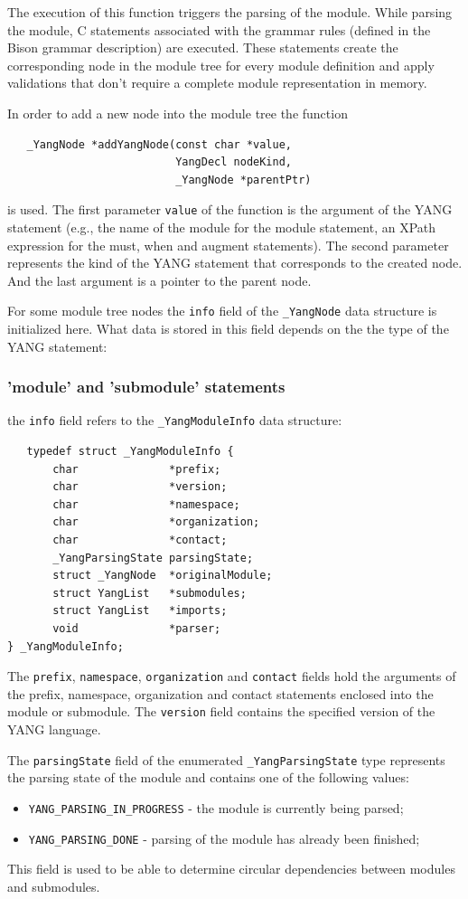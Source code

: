 \documentclass[conference]{IEEEtran}
\begin{document}
The execution of this function triggers the parsing of the module. While parsing the module, C statements associated with the grammar rules (defined in the Bison grammar description) are executed. These statements create the corresponding node in the module tree for every module definition and apply validations that don't require a complete module representation in memory.

In order to add a new node into the module tree the function
\small
\begin{verbatim}
   _YangNode *addYangNode(const char *value, 
                          YangDecl nodeKind, 
                          _YangNode *parentPtr)
\end{verbatim}
\normalsize
is used.
The first parameter \texttt{value} of the function is the argument of the YANG statement (e.g., the name of the module for the module statement, an XPath expression for the must, when and augment statements). The second parameter represents the kind of the YANG statement that corresponds to the created node. And the last argument is a pointer to the parent node.

For some module tree nodes the \texttt{info} field of the \texttt{\_YangNode} data structure is initialized here. What data is stored in this field depends on the the type of the YANG statement:
\subsubsection{'module' and 'submodule' statements}
the \texttt{info} field refers to the \texttt{\_YangModuleInfo} data structure:

\small
\begin{verbatim}
   typedef struct _YangModuleInfo {
       char              *prefix;
       char              *version;
       char              *namespace;
       char              *organization;
       char              *contact;
       _YangParsingState parsingState;
       struct _YangNode  *originalModule;
       struct YangList   *submodules;
       struct YangList   *imports;
       void              *parser;
} _YangModuleInfo;
\end{verbatim}
\normalsize
The \texttt{prefix}, \texttt{namespace}, \texttt{organization} and \texttt{contact} fields hold the arguments of the prefix, namespace, organization and contact statements enclosed into the module or submodule. The \texttt{version} field contains the specified version of the YANG language.

The \texttt{parsingState} field of the enumerated \texttt{\_YangParsingState} type represents the parsing state of the module and contains one of the following values:
\begin{itemize}
\item \texttt{YANG\_PARSING\_IN\_PROGRESS} - the module is currently being parsed;
\item \texttt{YANG\_PARSING\_DONE} - parsing of the module has already been finished;
\end{itemize}
This field is used to be able to determine circular dependencies between modules and submodules.
\end{document}
